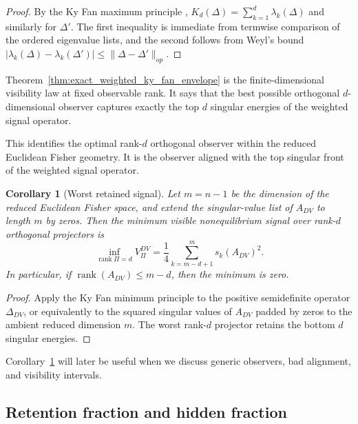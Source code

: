 \documentclass[11pt,a4paper]{article}
\numberwithin{equation}{section}
\theoremstyle{thmcompact}
\newtheorem{corollary}[theorem]{Corollary}
\theoremstyle{remark}
\begin{document}
\begin{proof}
By the Ky Fan maximum principle \cite{Fan1951,Bhatia1997}, \(K_d(\Delta)=\sum_{k=1}^d \lambda_k(\Delta)\) and similarly for \(\Delta'\). The first inequality is immediate from termwise comparison of the ordered eigenvalue lists, and the second follows from Weyl's bound \( |\lambda_k(\Delta)-\lambda_k(\Delta')|\le \|\Delta-\Delta'\|_{op} \).
\end{proof}

Theorem~\ref{thm:exact_weighted_ky_fan_envelope} is the finite-dimensional visibility law at fixed observable rank. It says that the best possible orthogonal \(d\)-dimensional observer captures exactly the top \(d\) singular energies of the weighted signal operator.

This identifies the optimal rank-\(d\) orthogonal observer within the reduced Euclidean Fisher geometry. It is the observer aligned with the top singular front of the weighted signal operator.

\begin{corollary}[Worst retained signal]
\label{cor:worst_retained_signal}
Let \(m=n-1\) be the dimension of the reduced Euclidean Fisher space, and extend the singular-value list of \(A_{DV}\) to length \(m\) by zeros. Then the minimum visible nonequilibrium signal over rank-\(d\) orthogonal projectors is
\begin{equation}
\inf_{\operatorname{rank}\Pi=d}V_\Pi^{DV}
=
\frac14\sum_{k=m-d+1}^{m}s_k(A_{DV})^2.
\end{equation}
In particular, if \(\operatorname{rank}(A_{DV})\le m-d\), then the minimum is zero.
\end{corollary}

\begin{proof}
Apply the Ky Fan minimum principle to the positive semidefinite operator \(\Delta_{DV}\), or equivalently to the squared singular values of \(A_{DV}\) padded by zeros to the ambient reduced dimension \(m\). The worst rank-\(d\) projector retains the bottom \(d\) singular energies.
\end{proof}

Corollary~\ref{cor:worst_retained_signal} will later be useful when we discuss generic observers, bad alignment, and visibility intervals.

\subsection{Retention fraction and hidden fraction}
\end{document}
